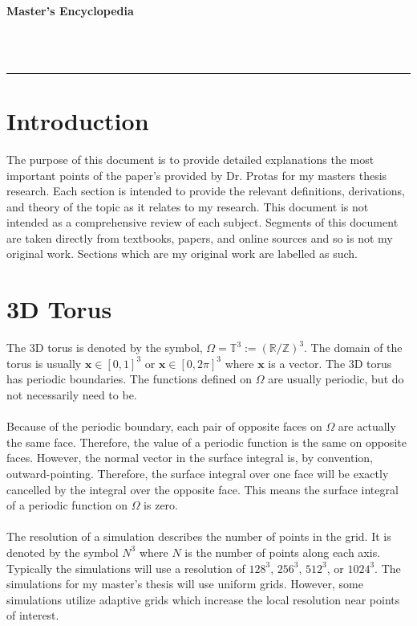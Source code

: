 \documentclass[12pt]{article}
\begin{document}
\begin{center}
\begin{huge}
\textbf{Master's Encyclopedia}
\end{huge}
\\~\\
\noindent\rule{16.5cm}{0.4pt}
\end{center}

\tableofcontents

\begin{flushleft}

\section{Introduction}
\qquad The purpose of this document is to provide detailed explanations the most important points of the paper's provided by Dr. Protas for my masters thesis research. Each section is intended to provide the relevant definitions, derivations, and theory of the topic as it relates to my research. This document is not intended as a comprehensive review of each subject. Segments of this document are taken directly from textbooks, papers, and online sources and so is not my original work. Sections which are my original work are labelled as such.

\section{3D Torus}
\qquad The 3D torus is denoted by the symbol, $\Omega = \mathbb{T}^3 := (\mathbb{R}/\mathbb{Z})^3$. The domain of the torus is usually $\boldsymbol x\in [0,1]^3$ or $\boldsymbol x\in [0,2\pi]^3$ where $\boldsymbol x$ is a vector. The 3D torus has periodic boundaries. The functions defined on $\Omega$ are usually periodic, but do not necessarily need to be.
\\~\\
\qquad Because of the periodic boundary, each pair of opposite faces on $\Omega$ are actually the same face. Therefore, the value of a periodic function is the same on opposite faces. However, the normal vector in the surface integral is, by convention, outward-pointing. Therefore, the surface integral over one face will be exactly cancelled by the integral over the opposite face. This means the surface integral of a periodic function on $\Omega$ is zero.
\\~\\
\qquad The resolution of a simulation describes the number of points in the grid. It is denoted by the symbol $N^3$ where $N$ is the number of points along each axis. Typically the simulations will use a resolution of $128^3$, $256^3$, $512^3$, or $1024^3$. The simulations for my master's thesis will use uniform grids. However, some simulations utilize adaptive grids which increase the local resolution near points of interest.


\end{flushleft}
\end{document}
